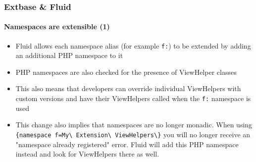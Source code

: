 
\begin{frame}[fragile]
	\frametitle{Extbase \& Fluid}
	\framesubtitle{Namespaces are extensible (1)}

	\begin{itemize}

		\item Fluid allows each namespace alias (for example \texttt{f:}) to be
			extended by adding an additional PHP namespace to it

		\item PHP namespaces are also checked for the presence of ViewHelper classes

		\item This also means that developers can override individual ViewHelpers
			with custom versions and have their ViewHelpers called when the
			\texttt{f:} namespace is used

		\item This change also implies that namespaces are no longer monadic.\newline
			When using
			\texttt{
				\{namespace f=My\textbackslash
				Extension\textbackslash
				ViewHelpers\textbackslash\}}\newline
				you will no longer receive an "namespace already registered" error.
				Fluid will add this PHP namespace instead and look for ViewHelpers
				there as well.

	\end{itemize}

\end{frame}


